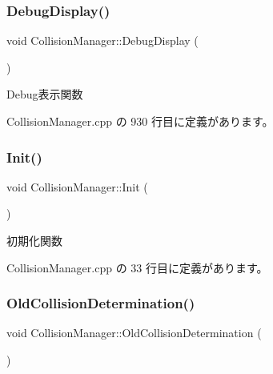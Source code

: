 \subsubsection{\texorpdfstring{Debug\+Display()}{DebugDisplay()}}
{\footnotesize\ttfamily void Collision\+Manager\+::\+Debug\+Display (\begin{DoxyParamCaption}{ }\end{DoxyParamCaption})\hspace{0.3cm}{\ttfamily [private]}}



Debug表示関数 



 Collision\+Manager.\+cpp の 930 行目に定義があります。

\mbox{\label{class_collision_manager_a2c5770b90b7a46a5674df008a7a57145}} 
\subsubsection{\texorpdfstring{Init()}{Init()}}
{\footnotesize\ttfamily void Collision\+Manager\+::\+Init (\begin{DoxyParamCaption}{ }\end{DoxyParamCaption})}



初期化関数 



 Collision\+Manager.\+cpp の 33 行目に定義があります。

\mbox{\label{class_collision_manager_a25dbc14dbc709a6bc2dc4424e3965dbe}} 
\subsubsection{\texorpdfstring{Old\+Collision\+Determination()}{OldCollisionDetermination()}}
{\footnotesize\ttfamily void Collision\+Manager\+::\+Old\+Collision\+Determination (\begin{DoxyParamCaption}{ }\end{DoxyParamCaption})\hspace{0.3cm}{\ttfamily [private]}}




